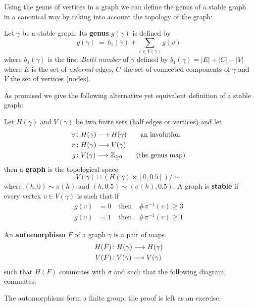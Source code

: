 Using the genus of vertices in a graph we can define the genus of a stable graph in a canonical way by taking into account the topology of the graph:

\begin{definition}
  Let $\gamma$ be a stable graph. Its \textbf{genus} $g(\gamma)$ is defined by
  $$ g(\gamma) \ = \ b_1(\gamma) + \sum_{v\in V(\gamma)} g(v) $$
  where $b_1(\gamma)$ is the first \emph{Betti number} of $\gamma$ defined by $b_1(\gamma) = |E| + |C| - |V|$ where $E$ is the set of \emph{external} edges, $C$ the set of connected components of $\gamma$ and $V$ the set of vertices (nodes).
\end{definition}

As promised we give the following alternative yet equivalent definition of a stable graph:

\begin{definition}
  Let $H(\gamma)$ and $V(\gamma)$ be two finite sets (half edges or vertices) and let
  \begin{align}
    \sigma &\colon H(\gamma) \longrightarrow H(\gamma) \quad \quad \text{an involution}\\
    \pi &\colon H(\gamma) \longrightarrow V(\gamma)\\
    g &\colon V(\gamma) \longrightarrow \mathbb{Z}_{\geq 0} \quad \quad \text{(the genus map)}
  \end{align}
  then a \textbf{graph} is the topological space
  $$ V(\gamma) \sqcup (H(\gamma) \times [0, 0.5]) / \sim $$
  where $(h,0) \sim \pi(h)$ and $(h,0.5) \sim (\sigma(h), 0.5)$. A graph is \textbf{stable} if every vertex $v \in V(\gamma)$ is such that if
  \begin{align}
    g(v) &= 0 \quad \text{then} \quad \# \pi^{-1}(v) \geq 3\\
    g(v) &= 1 \quad \text{then} \quad \# \pi^{-1}(v) \geq 1
  \end{align}
\end{definition}

\begin{definition}
  An \textbf{automorphism} $F$ of a graph $\gamma$ is a pair of maps
  \begin{align}
    H(F) &\colon H(\gamma) \longrightarrow H(\gamma)\\
    V(F) &\colon V(\gamma) \longrightarrow V(\gamma)
  \end{align}
  such that $H(F)$ commutes with $\sigma$ and such that the following diagram commutes:
  \begin{center}
  \end{center}
  The automorphisms form a finite group, the proof is left as an exercise.
\end{definition}

